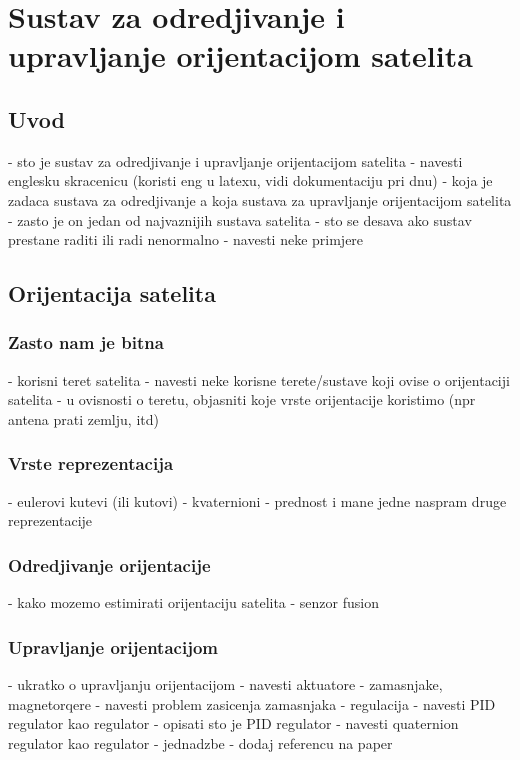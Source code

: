 \documentclass[times, utf8, diplomski, numeric]{templates/template}
\begin{document}
\chapter{Sustav za odredjivanje i upravljanje orijentacijom satelita}{
    \section{Uvod}{
        - sto je sustav za odredjivanje i upravljanje orijentacijom satelita
            - navesti englesku skracenicu (koristi eng u latexu, vidi dokumentaciju pri dnu)
        - koja je zadaca sustava za odredjivanje a koja sustava za upravljanje orijentacijom satelita
        - zasto je on jedan od najvaznijih sustava satelita
            - sto se desava ako sustav prestane raditi ili radi nenormalno
                - navesti neke primjere
    }

    \section{Orijentacija satelita}{
        \subsection{Zasto nam je bitna}{
            - korisni teret satelita
                - navesti neke korisne terete/sustave koji ovise o orijentaciji satelita
                - u ovisnosti o teretu, objasniti koje vrste orijentacije koristimo (npr antena prati zemlju, itd)
        }

        \subsection{Vrste reprezentacija}{
            - eulerovi kutevi (ili kutovi)
            - kvaternioni
            - prednost i mane jedne naspram druge reprezentacije
        }

        \subsection{Odredjivanje orijentacije}{
            - kako mozemo estimirati orijentaciju satelita
                - senzor fusion
        }

        \subsection{Upravljanje orijentacijom}{
            - ukratko o upravljanju orijentacijom
            - navesti aktuatore
                - zamasnjake, magnetorqere
                - navesti problem zasicenja zamasnjaka
            - regulacija
                - navesti PID regulator kao regulator
                - opisati sto je PID regulator
                - navesti quaternion regulator kao regulator
                    - jednadzbe
                    - dodaj referencu na paper
        }
    }

}
\end{document}
